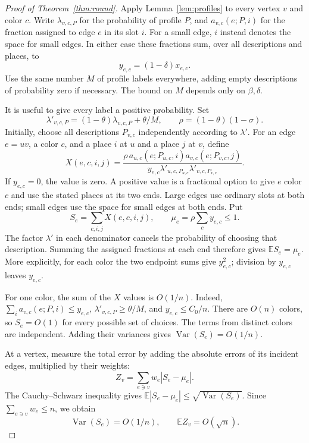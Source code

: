 \documentclass[11pt]{article}
\theoremstyle{definition}\newtheorem{algorithm}{Algorithm}[section]
\numberwithin{equation}{section}
\theoremstyle{remark}\newtheorem*{remark}{Remark}
\newcommand{\E}{\mathbb E}
\begin{document}
\begin{proof}[Proof of Theorem~\ref{thm:round}]
Apply Lemma~\ref{lem:profiles} to every vertex $v$ and color $c$.
Write $\lambda_{v,c,P}$ for the probability of profile $P$, and
$a_{v,c}(e;P,i)$ for the fraction assigned to edge $e$ in its slot $i$.
For a small edge, $i$ instead denotes the space for small edges.
In either case these fractions sum, over all descriptions and places, to
\[
 y_{e,c}=(1-\delta)x_{e,c}.
\]
Use the same number $M$ of profile labels everywhere, adding empty
descriptions of probability zero if necessary. The bound on $M$ depends
only on $\beta,\delta$.

It is useful to give every label a positive probability. Set
\[
 \lambda'_{v,c,P}=(1-\theta)\lambda_{v,c,P}+\theta/M,
 \qquad \rho=(1-\theta)(1-\sigma).
\]
Initially, choose all descriptions $P_{v,c}$ independently according to
$\lambda'$. For an edge $e=uv$, a color $c$, and a place $i$ at $u$ and
a place $j$ at $v$, define
\[
 X(e,c,i,j)=
 \frac{\rho\,a_{u,c}(e;P_{u,c},i)a_{v,c}(e;P_{v,c},j)}
 {y_{e,c}\lambda'_{u,c,P_{u,c}}\lambda'_{v,c,P_{v,c}}}.
\]
If $y_{e,c}=0$, the value is zero. A positive value is a fractional option
to give $e$ color $c$ and use the stated places at its two ends. Large
edges use ordinary slots at both ends; small edges use the space for small
edges at both ends. Put
\[
 S_e=\sum_{c,i,j}X(e,c,i,j),\qquad
 \mu_e=\rho\sum_c y_{e,c}\le1.
\]
The factor $\lambda'$ in each denominator cancels the probability of
choosing that description. Summing the assigned fractions at each end
therefore gives $\E S_e=\mu_e$. More explicitly, for each color the two endpoint sums give $y_{e,c}^2$; division by $y_{e,c}$ leaves $y_{e,c}$.

For one color, the sum of the $X$ values is $O(1/n)$. Indeed,
$\sum_i a_{v,c}(e;P,i)\le y_{e,c}$,
$\lambda'_{v,c,P}\ge\theta/M$, and $y_{e,c}\le C_0/n$.
There are $O(n)$ colors, so $S_e=O(1)$ for every possible set of choices.
The terms from distinct colors are independent. Adding their variances
gives $\operatorname{Var}(S_e)=O(1/n)$.

At a vertex, measure the total error by adding the absolute errors of its
incident edges, multiplied by their weights:
\[
 Z_v=\sum_{e\ni v}w_e|S_e-\mu_e|.
\]
The Cauchy--Schwarz inequality gives
$\E|S_e-\mu_e|\le\sqrt{\operatorname{Var}(S_e)}$.
Since $\sum_{e\ni v}w_e\le n$, we obtain
\begin{equation}\label{eq:L1}
 \operatorname{Var}(S_e)=O(1/n),\qquad \E Z_v=O(\sqrt n).
\end{equation}


\end{proof}
\end{document}
